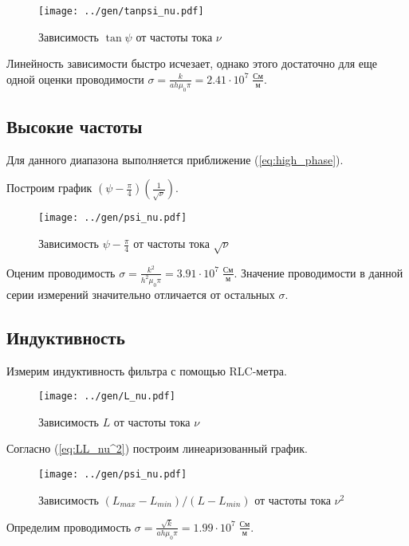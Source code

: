 \begin{figure}[H]
	\centering
	\texttt{[image: ../gen/tanpsi\_nu.pdf]}
	\caption{Зависимость $\tan \psi$ от частоты тока $\nu$}
	\label{fig:tanpsi_nu}
\end{figure}

Линейность зависимости быстро исчезает, однако этого достаточно для еще одной оценки проводимости $\sigma = \frac{k}{a h \mu_0 \pi} = 2.41 \cdot 10^7 \; \frac{\text{См}}{\text{м}}$.

\subsection*{Высокие частоты}

Для данного диапазона выполняется приближение (\ref{eq:high_phase}).

Построим график $(\psi - \frac{\pi}{4}) (\frac{1}{\sqrt{\nu}})$.

\begin{figure}[H]
	\centering
	\texttt{[image: ../gen/psi\_nu.pdf]}
	\caption{Зависимость $\psi - \frac{\pi}{4}$ от частоты тока $\sqrt{\nu}$}
	\label{fig:psi_nu}
\end{figure}

Оценим проводимость $\sigma = \frac{k^2}{h^2 \mu_0 \pi}= 3.91 \cdot 10^7 \; \frac{\text{См}}{\text{м}}$.
Значение проводимости в данной серии измерений значительно отличается от остальных $\sigma$.

\subsection*{Индуктивность}

Измерим индуктивность фильтра с помощью RLC-метра. 

\begin{figure}[H]
	\centering
	\texttt{[image: ../gen/L\_nu.pdf]}
	\caption{Зависимость $L$ от частоты тока $\nu$}
	\label{fig:L_nu}
\end{figure}

Согласно (\ref{eq:LL_nu^2}) построим линеаризованный график.

\begin{figure}[H]
	\centering
	\texttt{[image: ../gen/psi\_nu.pdf]}
	\caption{Зависимость $(L_{max} - L_{min})/(L - L_{min})$ от частоты тока $\nu^2$}
	\label{fig:LL_nu^2}
\end{figure}

Определим проводимость $\sigma = \frac{\sqrt{k}}{a h \mu_0 \pi} = 1.99 \cdot 10^7 \; \frac{\text{См}}{\text{м}}$.

